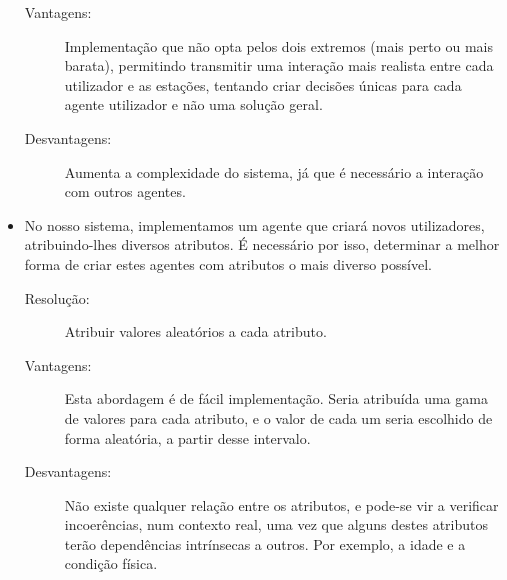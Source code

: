 \begin{itemize}
\begin{description}
			\item[Vantagens:] Implementação que não opta pelos dois extremos (mais perto ou mais barata), permitindo transmitir uma interação mais realista entre cada utilizador e as estações, tentando criar decisões únicas para cada agente utilizador e não uma solução geral. 		
			\item[Desvantagens:] Aumenta a complexidade do sistema, já que é necessário a interação com outros agentes.			\end{description}
\vspace{5mm}
  \item No nosso sistema, implementamos um agente que criará novos utilizadores, atribuindo-lhes diversos atributos. É necessário por isso, determinar a melhor forma de criar estes agentes com atributos o mais diverso possível.
		\begin{description}
			\item[Resolução:] Atribuir valores aleatórios a cada atributo.
			\item[Vantagens:] Esta abordagem é de fácil implementação. Seria atribuída uma gama de valores para cada atributo, e o valor  de cada um seria escolhido de forma aleatória, a partir desse intervalo.
			\item[Desvantagens:] Não existe qualquer relação entre os atributos, e pode-se vir a verificar incoerências, num contexto real, uma vez que alguns destes atributos terão dependências intrínsecas a outros. Por exemplo, a idade e a condição física.
			\end{description}
\end{itemize}